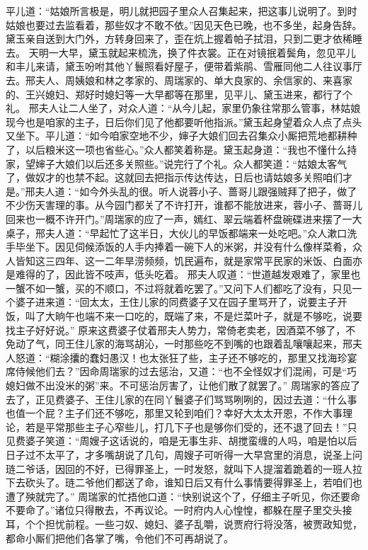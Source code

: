 \documentclass[12pt,oneside]{book}
\begin{document}
平儿道：“姑娘所言极是，明儿就把园子里众人召集起来，把这事儿说明了。到时姑娘也要过去监看着，那些奴才不敢不依。”因见天色已晚，也不多坐，起身告辞。黛玉亲自送到大门外，方转身回来了，歪在炕上握着帕子拭泪，只到二更才依稀睡去。
天明一大早，黛玉就起来梳洗，换了件衣裳。正在对镜抿着鬓角，忽见平儿和丰儿来请，黛玉吩咐其他丫鬟照看好屋子，便带着紫鹃、雪雁同他二人往议事厅去。邢夫人、周姨娘和林之孝家的、周瑞家的、单大良家的、余信家的、来喜家的、王兴媳妇、郑好时媳妇等一大早都等在那里，见平儿、黛玉进来，都行了个礼。
邢夫人让二人坐了，对众人道：“从今儿起，家里仍象往常那么管事，林姑娘现今也是咱家的主子，日后你们见了他都要听他指派。”黛玉起身望着众人点了点头又坐下。平儿道：“如今咱家空地不少，婶子大娘们回去召集众小厮把荒地都耕种了，以后粮米这一项也省些心。”众人都笑着称是。黛玉起身道：“我也不懂什么持家，望婶子大娘们以后还多关照些。”说完行了个礼。众人都笑道：“姑娘太客气了，做奴才的也禁不起。这就回去把指示传达传达，日后也请姑娘多关照咱们才是。”邢夫人道：“如今外头乱的很。听人说蓉小子、蔷哥儿跟强贼拜了把子，做了不少伤天害理的事。从今园门都关了不许打开，谁都不能放进来，蓉小子、蔷哥儿回来也一概不许开门。”周瑞家的应了一声，嫣红、翠云端着杯盘碗碟进来摆了一大桌子，邢夫人道：“早起忙了这半日，大伙儿的早饭都端来一处吃吧。”众人漱口洗手毕坐下。因见伺候添饭的人手内捧着一碗下人的米粥，并没有什么像样菜肴，众人皆知这三四年、这一二年旱涝频频，饥民遍布，就是家常平民家的米饭、白面亦是难得的了，因此皆不吱声，低头吃着。
邢夫人叹道：“世道越发艰难了，家里也一蟹不如一蟹，买的不顺口，不过将就着吃罢了。”又问下人们都吃了没有，只见一个婆子进来道：“回太太，王住儿家的同费婆子又在园子里骂开了，说要主子开饭，叫了大晌午也端不来一口吃的，既端了来，不是烂菜叶子，就是不够吃，说要找主子好好说。”
原来这费婆子仗着邢夫人势力，常倚老卖老，因酒菜不够了，不免动了气，同王住儿家的海骂胡沁，一时那些吃不到嘴的也跟着乱嚷嚷起来，邢夫人怒道：“糊涂攮的蠢妇愚汉！也太张狂了些，主子还不够吃的，那里又找海珍宴席侍候他们去？”因命周瑞家的过去惩治，又道：“也不全怪奴才们混闹，可是“巧媳妇做不出没米的粥”来。不可惩治厉害了，让他们散了就罢了。”
周瑞家的答应了去了，正见费婆子、王住儿家的在同丫鬟婆子们骂骂咧咧的，因过去道：“什么事也值一个屁？主子们还不够吃，那里又轮到咱们？幸好大太太开恩，不作大事理论，若是平常那些主子心窄些儿，打几下子也是够你们受的，还不退了回去！”只见费婆子笑道：“周嫂子这话说的，咱是无事生非、胡搅蛮缠的人吗，咱是怕以后日子过不太平了，才多嘴胡说了几句，周嫂子可听得一大早宫里的消息，说圣上问琏二爷话，因回的不好，已得罪圣上，一时发怒，就叫下人提溜着跪着的一班人拉下去砍头了。琏二爷他们都送了命，谁知日后又有什么事情要得罪圣上，若咱们也遭了殃就完了。”
周瑞家的忙捂他口道：“快别说这个了，仔细主子听见，你还要命不要命了。”诸位只得散去，不再议论。一时府内人心惶惶，都躲在屋子里交头接耳，个个担忧前程。一些刁奴、媳妇、婆子乱嚼，说贾府行将没落，被贾政知觉，都命小厮们把他们各掌了嘴，令他们不可再胡说了。
\end{document}
